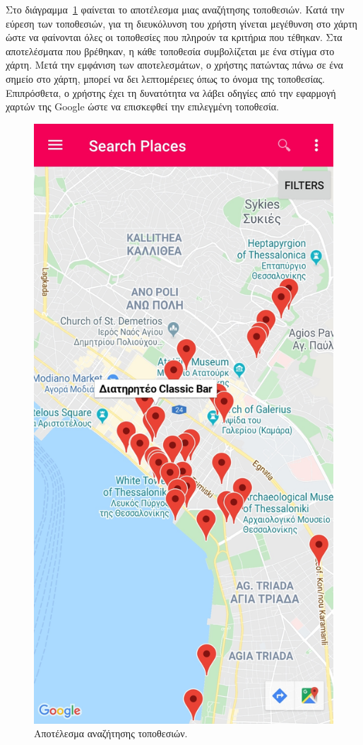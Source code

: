 \documentclass[oneside, 12pt]{book}
\begin{document}
Στο διάγραμμα~\ref{fig:search_places_2} φαίνεται το αποτέλεσμα μιας 
αναζήτησης τοποθεσιών. Κατά την εύρεση των τοποθεσιών, για τη 
διευκόλυνση του χρήστη γίνεται μεγέθυνση στο χάρτη ώστε να φαίνονται 
όλες οι τοποθεσίες που πληρούν τα κριτήρια που τέθηκαν. Στα 
αποτελέσματα που βρέθηκαν, η κάθε τοποθεσία συμβολίζεται με ένα στίγμα
στο χάρτη. Μετά την εμφάνιση των αποτελεσμάτων, ο χρήστης πατώντας
πάνω σε ένα σημείο στο χάρτη, μπορεί να δει λεπτομέρειες όπως το όνομα
της τοποθεσίας. Επιπρόσθετα, ο χρήστης έχει τη δυνατότητα να λάβει 
οδηγίες από την εφαρμογή χαρτών της Google ώστε να επισκεφθεί την 
επιλεγμένη τοποθεσία.
\begin{figure}[h]
  \centering
  \includegraphics[scale=0.15]{images/search_places_result.jpg}
  \caption{\label{fig:search_places_2}Αποτέλεσμα αναζήτησης τοποθεσιών.}
\end{figure}
\end{document}
